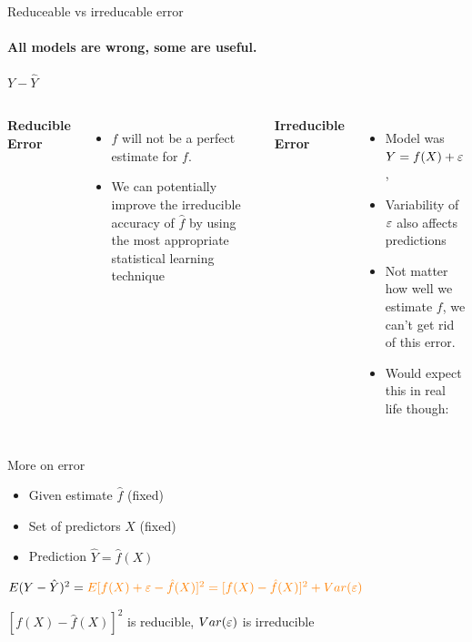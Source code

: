 \documentclass[aspectratio=169,dvipsnames]{beamer}
\newcommand{\InstructorNotes}[1]{{\color{orange}#1}}
\newcommand{\InstructorList}[1]{
\begin{itemize}
	\color{orange}
	#1
\end{itemize}
}
\begin{document}
\begin{frame}[t]{Reduceable vs irreducable error}
	\framesubtitle{
	All models are wrong, some are useful.
	}
	\centering

	$Y - \hat Y$

	\begin{columns}
	\centering
	\textbf{Reducible Error}

	\InstructorList{
		\item $\hat f$ will not be a perfect estimate for $f$.
		\item We can potentially improve the irreducible
		accuracy of $\hat f $ by using the most appropriate statistical learning technique 
	}

	\centering

	\textbf{Irreducible Error}

	\InstructorList{
		\item Model was $Y = f(X) + \varepsilon$,
		\item Variability of $\varepsilon$ also affects predictions
		\item Not matter how well we estimate $f$, we can't get rid of this error.
		\item Would expect this in real life though:
	}
	\end{columns}

\end{frame}
\begin{frame}[t]{More on error}
	\begin{itemize}
		\item
Given estimate $\hat f$ (fixed)
		\item
Set of predictors $X$  (fixed)
		\item
Prediction $\hat Y = \hat f(X)$
	\end{itemize}

\qquad

{
	\Large
	$
		E(Y-\hat Y)^2 =
		\InstructorNotes{E[f(X) + \e -\hat f(X)]^2 = [f(X) - \hat f (X)]^2 + Var(\e)}
		$
}

\InstructorNotes{$[f(X) - \hat f (X)]^2$ is reducible, $Var(\varepsilon)$ is irreducible}
\end{frame}
\end{document}
